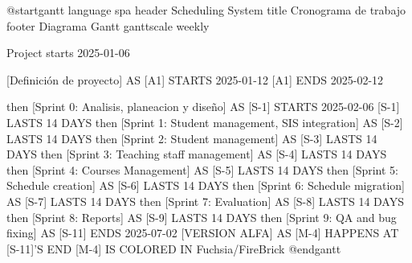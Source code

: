 @startgantt
language spa
header Scheduling System
title Cronograma de trabajo
footer Diagrama Gantt
ganttscale weekly

Project starts 2025-01-06

[Definición de proyecto] AS [A1] STARTS 2025-01-12
[A1] ENDS 2025-02-12

then [Sprint 0: Analisis, planeacion y diseño] AS [S-1] STARTS 2025-02-06
[S-1] LASTS 14 DAYS
then [Sprint 1: Student management, SIS integration] AS [S-2] LASTS 14 DAYS
then [Sprint 2: Student management] AS [S-3] LASTS 14 DAYS
then [Sprint 3: Teaching staff management] AS [S-4] LASTS 14 DAYS
then [Sprint 4: Courses Management] AS [S-5] LASTS 14 DAYS
then [Sprint 5: Schedule creation] AS [S-6] LASTS 14 DAYS
then [Sprint 6: Schedule migration] AS [S-7] LASTS 14 DAYS
then [Sprint 7: Evaluation] AS [S-8] LASTS 14 DAYS
then [Sprint 8: Reports] AS [S-9] LASTS 14 DAYS
then [Sprint 9: QA and bug fixing] AS [S-11] ENDS 2025-07-02
[VERSION ALFA] AS [M-4] HAPPENS AT [S-11]'S END
[M-4] IS COLORED IN Fuchsia/FireBrick
@endgantt
